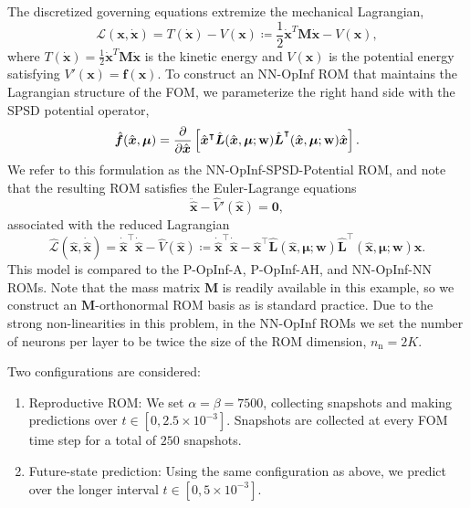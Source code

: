 \documentclass[3p,computermodern,11pt]{elsarticle}
\numberwithin{equation}{section}
\newcommand{\reducedState}{\hat{\state}}
\newcommand{\reducedStateDot}{\dot{\hat{\state}}}
\newcommand{\reducedSpdMatrixLowerNN}{\hat{\boldsymbol L}}
\newcommand{\weights}{\mathbf{w}}
\newcommand{\mass}{\boldsymbol M}
\newcommand{\reducedVelocity}{\skew{4}\hat{\velocity}}
\newcommand{\state}{\boldsymbol x}
\newcommand{\stateDot}{\dot{\state}}
\newcommand{\velocity}{\boldsymbol f}
\newcommand{\params}{\boldsymbol \mu}
\begin{document}
The discretized governing equations extremize the mechanical Lagrangian,
$$\mathcal{L} ( \state,\stateDot ) = T(\stateDot) - V(\state) \coloneqq \frac{1}{2}\stateDot^T \mass \stateDot - V(\state),$$
where $T(\stateDot) = \frac{1}{2} \stateDot^T \mass \stateDot$ is the kinetic energy and $V(\state)$ is the potential energy satisfying $V'(\state) = \boldsymbol f(\state)$.  To construct an NN-OpInf ROM that maintains the Lagrangian structure of the FOM, we parameterize the right hand side with the SPSD potential operator,
\begin{equation}\label{eq:nnopinf_lagrangian}
\reducedVelocity(\reducedState,\params) =   \frac{\partial}{\partial \reducedState} \left[ \reducedState^\intercal\reducedSpdMatrixLowerNN(\reducedState,\params;\weights) \reducedSpdMatrixLowerNN^\intercal(\reducedState,\params;\weights)\reducedState \right]. 
\end{equation}
We refer to this formulation as the NN-OpInf-SPSD-Potential ROM, and note that the resulting ROM satisfies the Euler-Lagrange equations
$$ \ddot{\reducedState}  - \hat{V}'(\reducedState) = \mathbf{0},$$
associated with the reduced Lagrangian
$$\hat{\mathcal{L}} ( \reducedState,\reducedStateDot ) = \dot\reducedState^\intercal\dot\reducedState - \hat{V}(\reducedState) \coloneqq \dot\reducedState^\intercal\dot\reducedState - \reducedState^\intercal\reducedSpdMatrixLowerNN(\reducedState,\params;\weights) \reducedSpdMatrixLowerNN^\intercal(\reducedState,\params;\weights)\reducedState.$$
This model is compared to the P-OpInf-A, P-OpInf-AH, and NN-OpInf-NN ROMs. Note that the mass matrix $\mass$ is readily available in this example, so we construct an $\mass$-orthonormal ROM basis as is standard practice. Due to the strong non-linearities in this problem, in the NN-OpInf ROMs we set the number of neurons per layer to be twice the size of the ROM dimension, $n_{\mathrm{n}} = 2K$.

Two configurations are considered:
\begin{enumerate}
\item Reproductive ROM: We set $\alpha = \beta = 7500$, collecting snapshots and making predictions over $t \in [0,2.5 \times 10^{-3}]$. Snapshots are collected at every FOM time step for a total of $250$ snapshots.
\item Future-state prediction: Using the same configuration as above, we predict over the longer interval $t \in [0,5 \times 10^{-3}]$. 
\end{enumerate}
\end{document}
